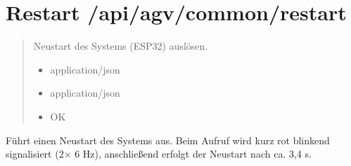 \documentclass[letterpaper,10pt,english]{sphinxmanual}
\begin{document}
\section{Restart \sphinxhyphen{} /api/agv/common/restart}
\label{\detokenize{agv_rest_api_common:restart-api-agv-common-restart}}\label{\detokenize{agv_rest_api_common:post-api-agv-common-restart}}

\begin{fulllineitems}
\label{\detokenize{agv_rest_api_common:post--api-agv-common-restart}}
\pysigstartsignatures
\pysigline
{}
\pysigstopsignatures\begin{quote}\begin{description}
\sphinxAtStartPar
Neustart des Systems (ESP32) auslösen.

\begin{itemize}
\item {} 
\sphinxAtStartPar
{} \textendash{} application/json

\end{itemize}

\begin{itemize}
\item {} 
\sphinxAtStartPar
{} \textendash{} application/json

\end{itemize}

\begin{itemize}
\item {} 
\sphinxAtStartPar
{} \textendash{} OK

\end{itemize}

\end{description}\end{quote}

\end{fulllineitems}


\sphinxAtStartPar
{}
Führt einen Neustart des Systems aus. Beim Aufruf wird kurz rot blinkend signalisiert (2× 6 Hz), anschließend erfolgt der Neustart nach ca. 3,4 s.
\end{document}

